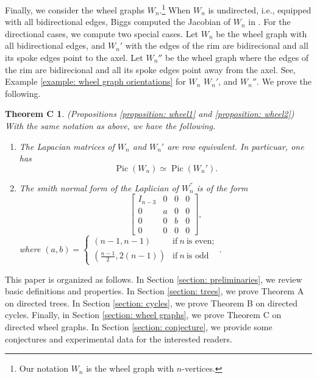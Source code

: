 \documentclass[11pt,reqno]{amsart}
\DeclareMathOperator{\Pic}{Pic}
\theoremstyle{definition}
\theoremstyle{plain}
\newtheorem*{nothmc}{Theorem C}
\begin{document}
Finally, we consider the wheel graphs $W_n$.\footnote{Our notation $W_n$ is the wheel graph with $n$-vertices.} When $W_n$ is undirected, i.e., equipped with all bidirectional edges, Biggs computed the Jacobian of $W_n$ in \cite{biggs1999chip}. For the directional cases, we compute two special cases. Let $W_n$ be the wheel graph with all bidirectional edges, and $W_n'$ with the edges of the rim are bidirecional and all its spoke edges point to the axel. Let $W_n{''}$ be the wheel graph where the edges of the rim are bidirecional and all its spoke edges point away from the axel. See, Example \ref{example: wheel graph orientations} for $W_n$ $W_n'$, and $W_n''$. We prove the following.

\begin{nothmc}(Propositions \ref{proposition: wheel1} and \ref{proposition: wheel2})
With the same notation as above, we have the following. 
\begin{enumerate}
\item 
The Lapacian matrices of $W_n$ and $W_n'$ are row equivalent. In particuar, one has 
\[
\Pic (W_n) \simeq \Pic (W_n').
\]
\item 
The smith normal form of the Laplician of $W_n^{''}$ is of the form 
\begin{equation*}
\left[
\begin{array}{c|ccc}	
I_{n-3} & 0 & 0 & 0 \\
\hline
0 & a & 0 & 0 \\
0 & 0 & b & 0 \\
0 & 0 & 0 & 0 
\end{array}
\right],
\end{equation*}
where 
$(a,b) = \begin{cases}
(n-1,n-1) & \text{if}~ n ~\text{is even}; \\
(\frac{n-1}2, 2(n-1)) & \text{if}~ n ~\text{is odd}
\end{cases}$.	
\end{enumerate}
\end{nothmc}


This paper is organized as follows. In Section \ref{section: preliminaries}, we review basic definitions and properties. In Section \ref{section: trees}, we prove Theorem A on directed trees. In Section \ref{section: cycles}, we prove Theorem B on directed cycles. Finally, in Section \ref{section: wheel graphs}, we prove Theorem C on directed wheel graphs. In Section \ref{section: conjecture}, we provide some conjectures and experimental data for the interested readers. 
\end{document}
